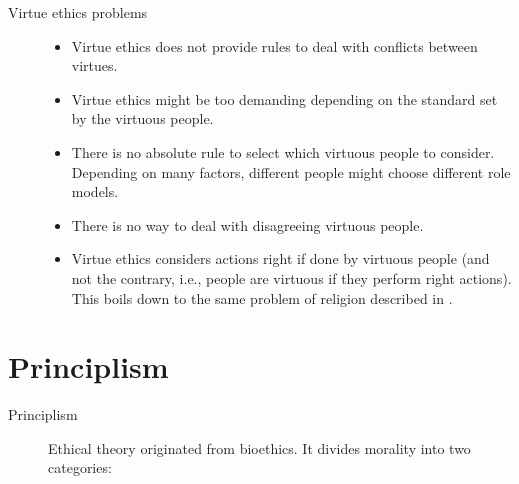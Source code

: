 \begin{description}
    \item[Virtue ethics problems] \phantom{} 
        \begin{itemize}
            \item Virtue ethics does not provide rules to deal with conflicts between virtues.
            \item Virtue ethics might be too demanding depending on the standard set by the virtuous people.
            \item There is no absolute rule to select which virtuous people to consider. Depending on many factors, different people might choose different role models.
            \item There is no way to deal with disagreeing virtuous people.
            \item Virtue ethics considers actions right if done by virtuous people (and not the contrary, i.e., people are virtuous if they perform right actions). This boils down to the same problem of religion described in .
        \end{itemize}
\end{description}



\section{Principlism}

\begin{description}
    \item[Principlism] 
        Ethical theory originated from bioethics. It divides morality into two categories:
\end{description}


